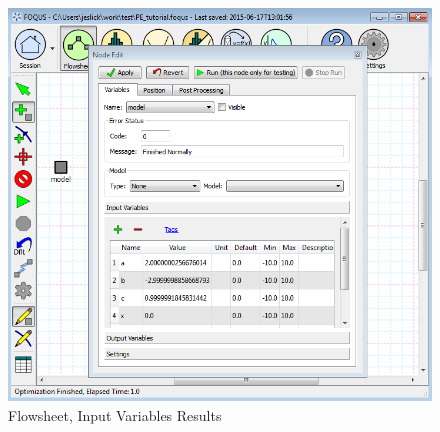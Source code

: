 \begin{figure}[H]
	\begin{center}
		\includegraphics[scale=0.55]{Chapt_optimization/figs/par_est_tut10}
		\caption{Flowsheet, Input Variables Results}
		\label{fig.pe.tut10}
	\end{center}
\end{figure}

